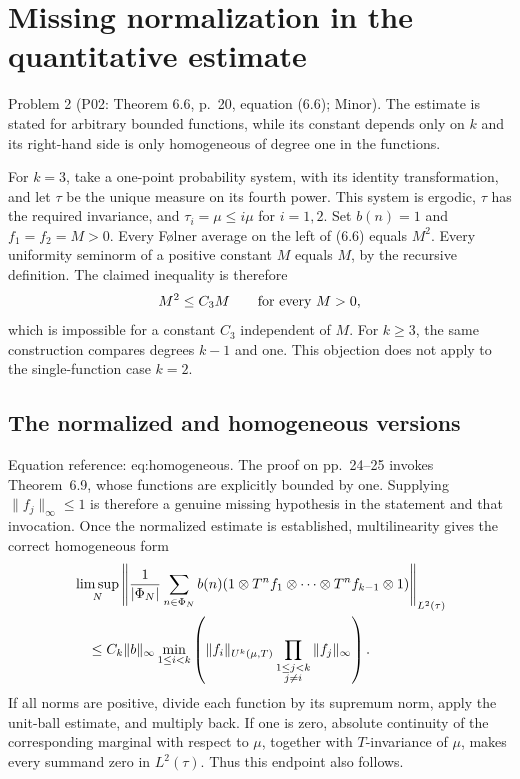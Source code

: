 \documentclass[10pt]{article}
\begin{document}
\section*{Missing normalization in the quantitative estimate}
Problem 2 (P02: Theorem 6.6, p. 20, equation (6.6); Minor).  The estimate is stated for arbitrary bounded functions, while its constant depends only on \(k\) and its right-hand side is only homogeneous of degree one in the functions.\par
For \(k=3\), take a one-point probability system, with its identity transformation, and let \(\tau\) be the unique measure on its fourth power. This system is ergodic, \(\tau\) has the required invariance, and \(\tau_i=\mu\leq i\mu\) for \(i=1,2\). Set \(b(n)=1\) and \(f_1=f_2=M>0\). Every Følner average on the left of (6.6) equals \(M^2\). Every uniformity seminorm of a positive constant \(M\) equals \(M\), by the recursive definition. The claimed inequality is therefore \[M^2\leq C_3 M
 \qquad\hbox{for every }M>0,\] which is impossible for a constant \(C_3\) independent of \(M\). For \(k\geq3\), the same construction compares degrees \(k-1\) and one. This objection does not apply to the single-function case \(k=2\).\par
\subsection*{The normalized and homogeneous versions}
Equation reference: eq:homogeneous. The proof on pp. 24–25 invokes Theorem 6.9, whose functions are explicitly bounded by one. Supplying \(\|f_j\|_\infty\leq1\) is therefore a genuine missing hypothesis in the statement and that invocation. Once the normalized estimate is established, multilinearity gives the correct homogeneous form \[\begin{aligned}
&\limsup_N\left\|
 \frac 1{|\Phi_N|}\sum_{n\in\Phi_N}b(n)(1\otimes T^nf_1\otimes\cdots\otimes T^nf_{k-1}\otimes 1)
 \right\|_{L^2(\tau)} \notag\\
&\quad\leq C_k\|b\|_\infty
 \min_{1\leq i<k}
 \left(\|f_i\|_{U^k(\mu,T)}
       \prod_{\substack{1\leq j<k\\j\ne i}}\|f_j\|_\infty\right).
 \end{aligned}\] If all norms are positive, divide each function by its supremum norm, apply the unit-ball estimate, and multiply back. If one is zero, absolute continuity of the corresponding marginal with respect to \(\mu\), together with \(T\)-invariance of \(\mu\), makes every summand zero in \(L^2(\tau)\). Thus this endpoint also follows.\par
\end{document}
